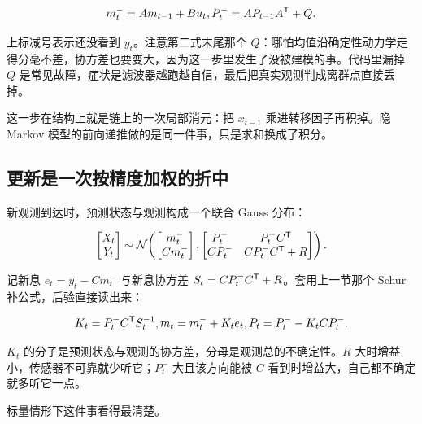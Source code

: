 \[
m_t^-=Am_{t-1}+Bu_t,
\space
P_t^-=AP_{t-1}A^{\mathsf{T}}+Q.
\]

上标减号表示还没看到 \(y_t\)。注意第二式末尾那个 \(Q\)：哪怕均值沿确定性动力学走得分毫不差，协方差也要变大，因为这一步里发生了没被建模的事。代码里漏掉 \(Q\) 是常见故障，症状是滤波器越跑越自信，最后把真实观测判成离群点直接丢掉。

这一步在结构上就是链上的一次局部消元：把 \(x_{t-1}\) 乘进转移因子再积掉。隐 Markov 模型的前向递推做的是同一件事，只是求和换成了积分。

\subsection{更新是一次按精度加权的折中}

新观测到达时，预测状态与观测构成一个联合 Gauss 分布：

\[
\begin{bmatrix}X_t\\ Y_t\end{bmatrix}
\sim\mathcal N\!\left(
\begin{bmatrix}m_t^-\\ Cm_t^-\end{bmatrix},
\begin{bmatrix}
P_t^- & P_t^-C^{\mathsf{T}}\\
CP_t^- & CP_t^-C^{\mathsf{T}}+R
\end{bmatrix}
\right).
\]

记新息 \(e_t=y_t-Cm_t^-\) 与新息协方差 \(S_t=CP_t^-C^{\mathsf{T}}+R\)。套用上一节那个 Schur 补公式，后验直接读出来：

\[
K_t=P_t^-C^{\mathsf{T}}S_t^{-1},
\space
m_t=m_t^-+K_te_t,
\space
P_t=P_t^--K_tCP_t^- .
\]

\(K_t\) 的分子是预测状态与观测的协方差，分母是观测总的不确定性。\(R\) 大时增益小，传感器不可靠就少听它；\(P_t^-\) 大且该方向能被 \(C\) 看到时增益大，自己都不确定就多听它一点。

标量情形下这件事看得最清楚。

